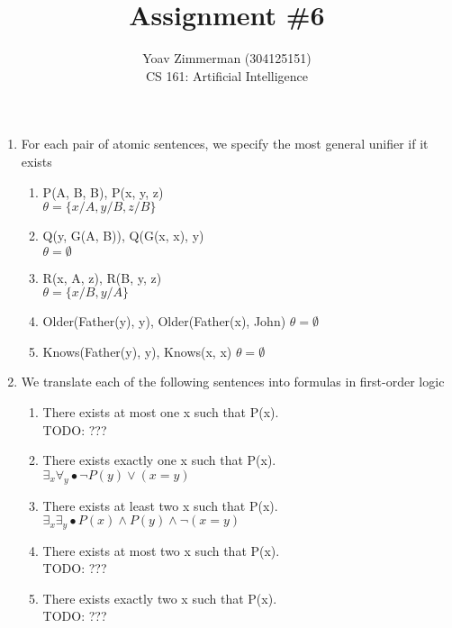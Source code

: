 \documentclass[12pt]{article}
\begin{document}
\title{Assignment \#6}
\author{Yoav Zimmerman (304125151) \\
	    CS 161: Artificial Intelligence}
\maketitle


\begin{enumerate}

	\item For each pair of atomic sentences, we specify the most general unifier if it exists
		\begin{enumerate}
			\item P(A, B, B), P(x, y, z) \\
				$ \theta = \{ x/A, y/B, z/B \} $
			\item Q(y, G(A, B)), Q(G(x, x), y) \\
				$ \theta = \emptyset $
			\item R(x, A, z), R(B, y, z) \\
				$ \theta = \{ x/B, y/A \} $
			\item Older(Father(y), y), Older(Father(x), John)
				$ \theta = \emptyset $
			\item Knows(Father(y), y), Knows(x, x)
				$ \theta = \emptyset $
		\end{enumerate}
		
	\item We translate each of the following sentences into formulas in first-order logic
		\begin{enumerate}
			\item There exists at most one x such that P(x). \\
				TODO: ???
			\item There exists exactly one x such that P(x). \\
				$\exists_x \forall_y \bullet \neg P(y) \lor (x = y) $
			\item There exists at least two x such that P(x). \\
				$\exists_x \exists_y \bullet P(x) \land P(y) \land \neg (x = y)$
			\item There exists at most two x such that P(x). \\
				TODO: ???
			\item There exists exactly two x such that P(x). \\
				TODO: ???
		\end{enumerate}


\end{enumerate}
\end{document}
